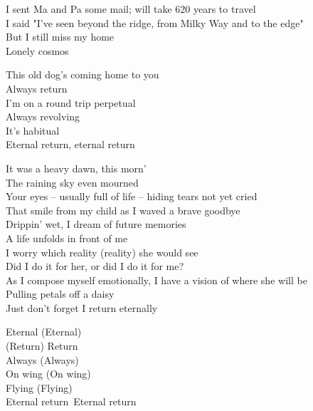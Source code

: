 
I sent Ma and Pa some mail; will take 620 years to travel\\
I said "I've seen beyond the ridge, from Milky Way and to the edge"\\
But I still miss my home\\
Lonely cosmos\\




This old dog's coming home to you\\
Always return\\
I'm on a round trip perpetual\\
Always revolving\\
It's habitual\\
Eternal return, eternal return\\


It was a heavy dawn, this morn'\\
The raining sky even mourned\\
Your eyes -- usually full of life -- hiding tears not yet cried\\
That smile from my child as I waved a brave goodbye\\
Drippin' wet, I dream of future memories\\
A life unfolds in front of me\\

I worry which reality (reality) she would see\\
Did I do it for her, or did I do it for me?\\
As I compose myself emotionally, I have a vision of where she will be\\
Pulling petals off a daisy\\
Just don't forget I return eternally\\


Eternal (Eternal)\\
(Return) Return\\
Always (Always)\\
On wing (On wing)\\
Flying (Flying)\\
Eternal return\
Eternal return\\

